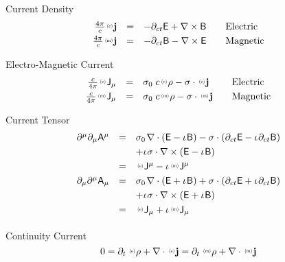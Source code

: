 \documentclass[aps,twocolumn,secnumarabic,nobalancelastpage,amsmath,amssymb,
amsthm,nofootinbib,parskip=full]{revtex4}
\numberwithin{equation}{section}
\newcommand{\iu}{\iota\mkern1mu}
\newcommand{\pauli}[1]{\sigma_#1\mkern2mu}
\newcommand{\qv}[1]{\mathbf{\mathsf{#1}}}
\newcommand{\ppv}[2]{{\,\raisebox{2pt}{\scalebox{.5}{(#1)\,}}}#2}
\newcommand{\qvl}[2]{\ppv{#1}{\mathbf{\mathsf{#2}}}}
\newcommand{\sv}[1]{\mathbf{#1}}
\newcommand{\svl}[2]{\ppv{#1}{\sv{#2}}}
\newcommand{\ssl}[2]{\ppv{#1}{#2}}
\begin{document}
Current Density
\begin{equation*}
\begin{array}{rclll}
\frac{4\pi}{c}\svl{e}{j}&=&
              -\partial_{ct}\qv{E}+\nabla\times\qv{B}&&\text{Electric} \\[3pt]
\frac{4\pi}{c}\svl{m}{j}&=&
               -\partial_{ct}\qv{B}-\nabla\times\qv{E}&&\text{Magnetic}
\end{array}
\end{equation*}

Electro-Magnetic Current
\begin{equation*}
\begin{array}{rclll}
\frac{c}{4\pi}\qvl{e}{J}_\mu&=&\pauli{0}\,c\ssl{e}{\rho}
                       -\sigma\cdot\svl{e}{j}&&\text{Electric} \\[3pt]
\frac{c}{4\pi}\qvl{m}{J}_\mu&=&\pauli{0}\,c\ssl{m}{\rho}
                       -\sigma\cdot\svl{m}{j}&&\text{Magnetic}
\end{array}
\end{equation*}

Current Tensor
\begin{equation*}
\begin{array}{rcl}
\partial^\mu\partial_\mu\qv{A}^\mu&=&
         \pauli{0}\nabla\cdot\left(\qv{E}-\iu\qv{B}\right)
        -\sigma\cdot\left(\partial_{ct}\qv{E}-
                                   \iu\partial_{ct}\qv{B}\right) \\[3pt]
      &&+\iu\sigma\cdot\nabla\times\left(\qv{E}-\iu\qv{B}\right) \\[3pt]
   &=&\qvl{e}{J}^\mu-\iu\qvl{m}{J}^\mu \\[3pt]
\partial_\mu\partial^\mu\qv{A}_\mu&=&
        \pauli{0}\nabla\cdot\left(\qv{E}+\iu\qv{B}\right)
        +\sigma\cdot\left(\partial_{ct}\qv{E}+
                                    \iu\partial_{ct}\qv{B}\right) \\[3pt]     &&+\iu\sigma\cdot\nabla\times\left(\qv{E}+\iu\qv{B}\right) \\[3pt]
   &=&\qvl{e}{J}_\mu+\iu\qvl{m}{J}_\mu \\[3pt]
\end{array}
\end{equation*}

Continuity Current
\begin{equation*}
0=\partial_t\,\ssl{e}{\rho}+\nabla\cdot\svl{e}{j}=
  \partial_t\,\ssl{m}{\rho}+\nabla\cdot\svl{m}{j}
\end{equation*}
\end{document}
